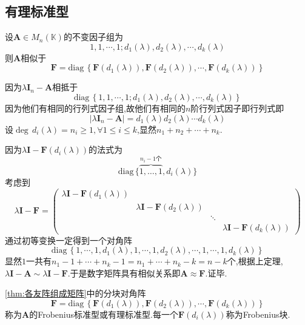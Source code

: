 \subsection{有理标准型}
\begin{formal}
\begin{theorem}[各友阵组成矩阵]\label{thm:各友阵组成矩阵}
    设$\bm{A}\in M_n\left(\mathbb{K}\right)$的不变因子组为\[
    1,1,\cdots,1;
    d_1\left(\lambda\right),d_2\left(\lambda\right),\cdots,d_k\left(\lambda\right)
    \]则$\bm{A}$相似于
    \[\bm{F}=
    \mathrm{diag}\,\left\{
\bm{F}\left(d_1\left(\lambda\right)\right),\bm{F}\left(d_2\left(\lambda\right)\right),\cdots,\bm{F}\left(d_k\left(\lambda\right)\right)
    \right\}
    \]
\end{theorem}
\begin{Proof}
因为$\lambda\bm{I}_n-\bm{A}$相抵于
\[
\mathrm{diag}\,\left\{1,1,\cdots,1;
    d_1\left(\lambda\right),d_2\left(\lambda\right),\cdots,d_k\left(\lambda\right)
\right\}
\]因为他们有相同的行列式因子组,故他们有相同的$n$阶行列式因子即行列式即
\[
\left|
\lambda\bm{I}_n-\bm{A}  
\right|=d_1\left(\lambda\right)d_2\left(\lambda\right)\cdots d_k\left(\lambda\right)
\]设$\deg\,d_i\left(\lambda\right)=n_i\geqslant 1,\forall 1\leqslant i\leqslant k$,显然$n_1+n_2+\cdots+n_k.$

因为$\lambda\bm{I}-\bm{F}\left(d_i\left(\lambda\right)\right)$的法式为\[\mathrm{diag}\,\{
    \overbrace{1, \ldots, 1}^{n_i-1 \text{个}}, d_i\left(\lambda\right)
\}\]考虑到
\[
\lambda\bm{I}-\bm{F}=\begin{pmatrix}
    \lambda\bm{I}-\bm{F}\left(d_1\left(\lambda\right)\right)&&&\\
    &\lambda\bm{I}-\bm{F}\left(d_2\left(\lambda\right)\right)&&\\
    &&\ddots&\\
    &&&\lambda\bm{I}-\bm{F}\left(d_k\left(\lambda\right)\right)
\end{pmatrix}
\]通过初等变换一定得到一个对角阵
\[
\mathrm{diag}\,\left\{
    1,\cdots,1,d_1\left(\lambda\right),1,\cdots,1,d_2\left(\lambda\right),\cdots,1,\cdots,1,d_k\left(\lambda\right)
\right\}
\]显然$1$一共有$n_1-1+\cdots+n_k-1=n_1+\cdots+n_k-k=n-k$个,根据上定理,$\lambda\bm{I}-\bm{A}\sim\lambda\bm{I}-\bm{F}$.于是数字矩阵具有相似关系即$\bm{A}\approx\bm{F}$.证毕.
\end{Proof}
\end{formal}
\begin{formal}
\begin{definition}[有理标准型]\label{def:有理标准型}
    \cref{thm:各友阵组成矩阵}中的分块对角阵
    \[\bm{F}=
    \mathrm{diag}\,\left\{
\bm{F}\left(d_1\left(\lambda\right)\right),\bm{F}\left(d_2\left(\lambda\right)\right),\cdots,\bm{F}\left(d_k\left(\lambda\right)\right)
    \right\}
    \]称为$\bm{A}$的\textup{Frobenius}标准型或有理标准型.每一个$\bm{F}\left(d_i\left(\lambda\right)\right)$称为\textup{Frobenius}块.
\end{definition}
\end{formal}
